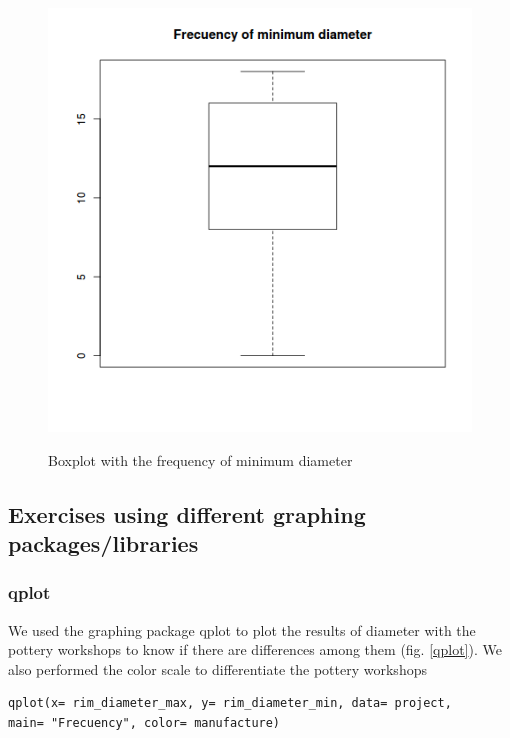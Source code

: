 \documentclass[10pt,a4paper]{article}
\begin{document}
\begin{figure}[hdp]
\centering
\includegraphics[scale=0.50]{boxplotmin.png}
\label{boxmin}
\caption{Boxplot with the frequency of minimum diameter}
\end{figure} 

\subsection{Exercises using different graphing packages/libraries} 


\subsubsection{qplot}

We used the graphing package qplot to plot the results of diameter with the pottery workshops to know if there are differences among them (fig. \ref{qplot}). We also performed the color scale to differentiate the pottery workshops 

\begin{verbatim}
qplot(x= rim_diameter_max, y= rim_diameter_min, data= project, 
main= "Frecuency", color= manufacture) 
\end{verbatim}
\end{document}
